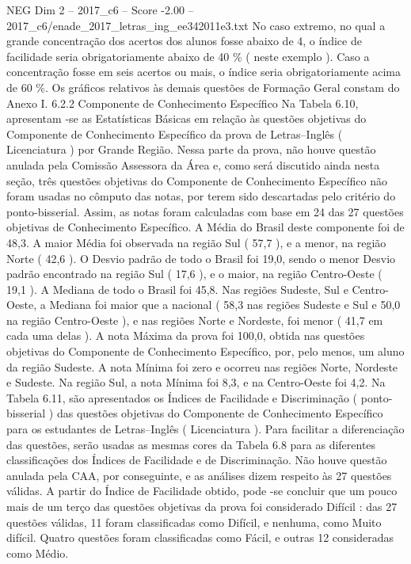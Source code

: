 \begin{textsample}{NEG Dim 2 – 2017\_c6 – Score -2.00 – 2017\_c6/enade\_2017\_letras\_ing\_ee342011e3.txt}
No caso extremo, no qual a grande concentração dos acertos dos alunos fosse abaixo de 4, o índice de facilidade seria obrigatoriamente abaixo de 40 \% ( neste exemplo ).
Caso a concentração fosse em seis acertos ou mais, o índice seria obrigatoriamente acima de 60 \%.
Os gráficos relativos às demais questões de Formação Geral constam do Anexo I. 6.2.2 Componente de Conhecimento Específico Na Tabela 6.10, apresentam -se as Estatísticas Básicas em relação às questões objetivas do Componente de Conhecimento Específico da prova de Letras–Inglês ( Licenciatura ) por Grande Região.
Nessa parte da prova, não houve questão anulada pela Comissão Assessora da Área e, como será discutido ainda nesta seção, três questões objetivas do Componente de Conhecimento Específico não foram usadas no cômputo das notas, por terem sido descartadas pelo critério do ponto-bisserial.
Assim, as notas foram calculadas com base em 24 das 27 questões objetivas de Conhecimento Específico.
A Média do Brasil deste componente foi de 48,3.
A maior Média foi observada na região Sul ( 57,7 ), e a menor, na região Norte ( 42,6 ).
O Desvio padrão de todo o Brasil foi 19,0, sendo o menor Desvio padrão encontrado na região Sul ( 17,6 ), e o maior, na região Centro-Oeste ( 19,1 ).
A Mediana de todo o Brasil foi 45,8.
Nas regiões Sudeste, Sul e Centro-Oeste, a Mediana foi maior que a nacional ( 58,3 nas regiões Sudeste e Sul e 50,0 na região Centro-Oeste ), e nas regiões Norte e Nordeste, foi menor ( 41,7 em cada uma delas ).
A nota Máxima da prova foi 100,0, obtida nas questões objetivas do Componente de Conhecimento Específico, por, pelo menos, um aluno da região Sudeste.
A nota Mínima foi zero e ocorreu nas regiões Norte, Nordeste e Sudeste.
Na região Sul, a nota Mínima foi 8,3, e na Centro-Oeste foi 4,2.
Na Tabela 6.11, são apresentados os Índices de Facilidade e Discriminação ( ponto-bisserial ) das questões objetivas do Componente de Conhecimento Específico para os estudantes de Letras–Inglês ( Licenciatura ).
Para facilitar a diferenciação das questões, serão usadas as mesmas cores da Tabela 6.8 para as diferentes classificações dos Índices de Facilidade e de Discriminação.
Não houve questão anulada pela CAA, por conseguinte, e as análises dizem respeito às 27 questões válidas.
A partir do Índice de Facilidade obtido, pode -se concluir que um pouco mais de um terço das questões objetivas da prova foi considerado Difícil : das 27 questões válidas, 11 foram classificadas como Difícil, e nenhuma, como Muito difícil.
Quatro questões foram classificadas como Fácil, e outras 12 consideradas como Médio.

\end{textsample}
